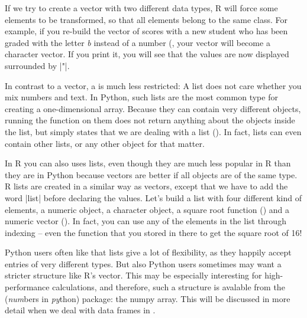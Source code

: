 If we try to
create a vector with two different data types, R will 
force some elements to be transformed, so that all elements belong to the same
class. For example, if you re-build the vector of scores with a new student who has
been graded with the letter \emph{b} instead of a number (, your vector
will become a character vector. If you print it, you will see that the
values are now displayed surrounded by |"|.




In contrast to a vector, a  is much less restricted: A list does not care
whether you mix numbers and text. In Python, such lists are the most common type for creating
a one-dimensional array. Because they
can contain very different objects, running the  function on them
does not return anything about the objects inside the list, but simply states that we
are dealing with a list ().
In fact, lists can even contain other lists, or any other object for
that matter.

In R you can also uses lists, even though they are much less popular in R than
they are in Python because vectors are better if all objects are of the same type.
R lists are created in a similar way as vectors, except that we have to add the word |list|
before declaring the values. Let's build a list with four different
kind of elements, a numeric object, a character object, a square root
function () and a numeric vector (). In fact, you
can use any of the elements in the list through indexing -- even the
function  that you stored in there to get the square root of
16!


Python users often like that lists give  a lot of flexibility, as they happily accept
entries of very different types. But also Python users sometimes may want a stricter
structure like R's vector. This may be especially interesting for
high-performance calculations, and therefore, such a structure is
avalable from the  (\emph{num}bers in \emph{py}thon)
package: the numpy array.
This will be discussed in more detail when we deal with data frames in .


